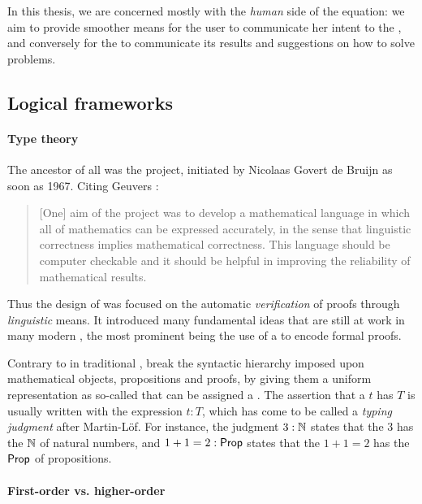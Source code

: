 \begin{emphpar}
In this thesis, we are concerned mostly with the \emph{human} side of the
equation: we aim to provide smoother means for the user to communicate her
intent to the , and conversely for the 
to communicate its results and suggestions on how to solve problems.
\end{emphpar}

\subsection{Logical frameworks}

\paragraph{Type theory}

The ancestor of all  was the  project,
initiated by Nicolaas Govert de Bruijn as soon as 1967. Citing Geuvers
:
\begin{quote}
[One] aim of the project was to develop a mathematical language in which all of
mathematics can be expressed accurately, in the sense that linguistic
correctness implies mathematical correctness. This language should be computer
checkable and it should be helpful in improving the reliability of mathematical
results.
\end{quote}
Thus the design of  was focused on the automatic
\emph{verification} of proofs through \emph{linguistic} means. It introduced
many fundamental ideas that are still at work in many modern , the most prominent being the use of a  to encode
formal proofs.

\AP
Contrary to  in traditional ,  break the
syntactic hierarchy imposed upon mathematical objects, propositions and proofs,
by giving them a uniform representation as so-called  that can be
assigned a . The assertion that a  $t$ has  $T$ is usually
written with the expression $t : T$, which has come to be called a \emph{typing
judgment} after Martin-Löf. For instance, the judgment $3 : \mathbb{N}$ states that
the  $3$ has the  $\mathbb{N}$ of natural numbers, and $1 + 1 = 2 : \mathsf{Prop}$
states that the  $1 + 1 = 2$ has the  $\mathsf{Prop}$ of propositions.

\paragraph{First-order vs. higher-order}

